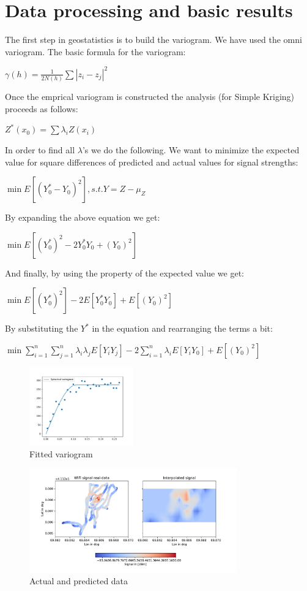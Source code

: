 \section{Data processing and basic results}
\label{section:results}

The first step in geostatistics is to build the variogram. We have used 
the omni variogram. The basic formula for the variogram:

$\gamma(h) = \frac{1}{2N(h)}\sum |z_i-z_j|^2$

Once the emprical variogram is constructed the analysis (for Simple Kriging)
proceeds as follows:

$Z^*(x_0)=\sum \lambda_i Z(x_i)$

In order to find all $\lambda$'s we do the following. We want to minimize the 
expected value for square differences of predicted and actual values for signal 
strengths:

$\min E[(Y_0^*-Y_0)^2], s.t. Y = Z - \mu_Z$

By expanding the above equation we get:

$\min E[(Y_0^*)^2-2Y^*_0Y_0+(Y_0)^2]$

And finally, by using the property of the expected value we get:

$\min E[(Y_0^*)^2]-2E[Y^*_0Y_0]+E[(Y_0)^2]$

By substituting the $Y^*$ in the equation and rearranging the terms a bit:

$\min \sum_{i=1}^{n}\sum_{j=1}^{n}\lambda_i\lambda_jE[Y_iY_j] - 2\sum_{i=1}^{n}\lambda_iE[Y_iY_0]+E[(Y_0)^2]$

\begin{figure}[h!]
\centering
\includegraphics[width=0.4\textwidth]{graphics/variogram.pdf}
\caption{Fitted variogram}
\label{fig:variogram}
\end{figure}

\begin{figure}[h!]
\centering
\includegraphics[width=0.8\textwidth]{graphics/estimate.pdf}
\caption{Actual and predicted data}
\label{fig:heatmap}
\end{figure}


